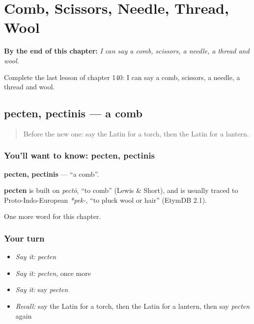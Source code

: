 
\chapter{Comb, Scissors, Needle, Thread, Wool}
\label{ch:la-comb-scissors-needle-thread-wool}

\begin{chapteropening}
\textbf{By the end of this chapter:} \emph{I can say a comb, scissors, a needle, a thread and wool.}

Complete the last lesson of chapter 140: I can say a comb, scissors, a needle, a thread and wool.
\end{chapteropening}

\section[pecten, pectinis]{pecten, pectinis — a comb}

\label{lesson:LA-C140-pecten}



\begin{quote}
Before the new one: say the Latin for a torch, then the Latin for a lantern.
\end{quote}

\subsection*{You'll want to know: pecten, pectinis}
\textbf{pecten, pectinis} — \textquotedblleft{}a comb\textquotedblright{}.

\begin{cousinweb}
\textbf{pecten} is built on \emph{pectō}, \textquotedblleft{}to comb\textquotedblright{} (Lewis \& Short), and is usually traced to Proto-Indo-European \emph{*pek-}, \textquotedblleft{}to pluck wool or hair\textquotedblright{} (EtymDB 2.1).
\end{cousinweb}

\begin{grammarlens}[title={What you've built}]
One more word for this chapter.
\end{grammarlens}

\subsection*{Your turn}
\begin{itemize}
\raggedright
  \item \emph{Say it:} \emph{pecten}
  \item \emph{Say it:} \emph{pecten}, once more
  \item \emph{Say it:} say \emph{pecten}
  \item \emph{Recall:} say the Latin for a torch, then the Latin for a lantern, then say \emph{pecten} again
\end{itemize}

